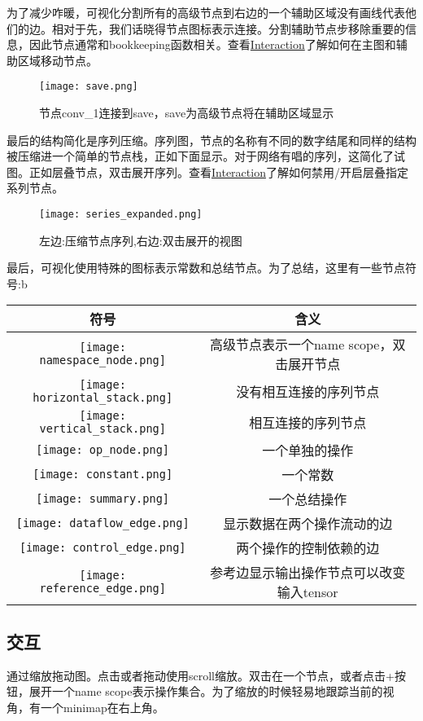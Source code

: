 为了减少咋暖，可视化分割所有的高级节点到右边的一个辅助区域没有画线代表他们的边。相对于先，我们话晓得节点图标表示连接。分割辅助节点步移除重要的信息，因此节点通常和bookkeeping函数相关。查看\href{https://www.tensorflow.org/programmers_guide/graph_viz#interaction}{Interaction}了解如何在主图和辅助区域移动节点。
\begin{figure}[H]
\centering
\texttt{[image: save.png]}
\caption{节点conv\_1连接到save，save为高级节点将在辅助区域显示}
\end{figure}
最后的结构简化是序列压缩。序列图，节点的名称有不同的数字结尾和同样的结构被压缩进一个简单的节点栈，正如下面显示。对于网络有唱的序列，这简化了试图。正如层叠节点，双击展开序列。查看\href{https://www.tensorflow.org/programmers_guide/graph_viz#interaction}{Interaction}了解如何禁用/开启层叠指定系列节点。
\begin{figure}[H]
\centering
\texttt{[image: series\_expanded.png]}
\caption{左边:压缩节点序列,右边:双击展开的视图}
\end{figure}
最后，可视化使用特殊的图标表示常数和总结节点。为了总结，这里有一些节点符号:b

\begin{table}[H]\label{fig:tensorboard_op}
\centering 
\begin{tabular}{|c|c|}
\hline
符号&含义\\
\hline 
\texttt{[image: namespace\_node.png]}&高级节点表示一个name scope，双击展开节点\\
\hline
\texttt{[image: horizontal\_stack.png]}&没有相互连接的序列节点\\
\hline
\texttt{[image: vertical\_stack.png]}&相互连接的序列节点\\
\hline
\texttt{[image: op\_node.png]}&一个单独的操作\\
\hline
\texttt{[image: constant.png]}&一个常数\\
\hline
\texttt{[image: summary.png]}&一个总结操作\\
\hline
\texttt{[image: dataflow\_edge.png]}&显示数据在两个操作流动的边\\
\hline
\texttt{[image: control\_edge.png]}&两个操作的控制依赖的边\\
\hline
\texttt{[image: reference\_edge.png]}&参考边显示输出操作节点可以改变输入tensor\\
\hline
\end{tabular}
\end{table}
\subsection{交互}
通过缩放拖动图。点击或者拖动使用scroll缩放。双击在一个节点，或者点击+按钮，展开一个name scope表示操作集合。为了缩放的时候轻易地跟踪当前的视角，有一个minimap在右上角。


